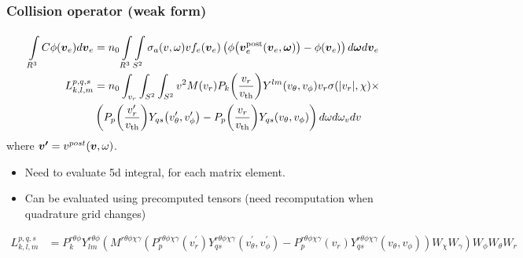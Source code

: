 \documentclass[mathserif, aspectratio=169]{beamer}
\newcommand{\vect}[1]{\boldsymbol{#1}}
\newcommand{\of}[1]{\mleft( #1 \mright)}
\newcommand{\vth}{v_{\textrm{th}}}
\newcommand{\myint}[2]{\int\limits_{#1}^{#2}}
\begin{document}
	\begin{frame}
		\frametitle{Collision operator (weak form)}
		\small{
		\begin{align*}
			\myint{R^3}{} C \phi\of{\vect{v}_e} d{\vect{v}_e} 
		 	&=
			n_0 \myint{R^3}{} \myint{S^2}{}
			\sigma_a(v,\omega) v 
			f_e\of{\vect{v}_e} \left(
			\phi\of{\vect{v}_e^\text{post}\of{\vect{v}_e,\vect{\omega}}} 
			- \phi\of{\vect{v}_e} 
			\right) d{\vect{\omega}}
			d{\vect{v}_e}  \\
			{L}_{k,l,m}^{p,q,s} &= n_0 \int_{v_r} \int_{S^2} \int_{S^2}  
			v^2 M(v_r) P_k \of{\frac{v_r}{\vth}} Y^{lm}\of{v_\theta, v_\phi} v_r\sigma(|v_r|,\chi) \times \\ & \left(
				P_p\of{\frac{v^{\prime}_r}{\vth}} Y_{qs}\of{v^{\prime}_\theta, v^{\prime}_\phi} - 
				P_p\of{\frac{v_r}{\vth}} Y_{qs}\of{v_\theta, v_\phi}
			\right) d\omega d\omega_v dv \\
		\end{align*} where $\vect{v^{\prime}} = v^{post}\of{\vect{v},\omega}$.
		}
		\begin{itemize}
			\item Need to evaluate 5d integral, for each matrix element. 
			\item Can be evaluated using precomputed tensors (need recomputation when quadrature grid changes)
		\end{itemize}
		\tiny
		{
			\begin{align*}
				{L}_{k,l,m}^{p,q,s} &=P^{r\theta\phi}_{k} Y_{lm}^{r\theta\phi} \left( M^{r\theta\phi\chi\gamma} \left(P^{r\theta\phi\chi\gamma}_{p} (v^\prime_r)	Y^{r\theta\phi\chi\gamma}_{qs} (v^\prime_\theta,v^{\prime}_\phi) - P^{r\theta\phi\chi\gamma}_{p} (v_r)	Y^{r\theta\phi\chi\gamma}_{qs} (v_\theta,v_\phi) \right) W_\chi W_\gamma \right) W_\phi W_\theta W_r
			\end{align*}
		}%
	\end{frame}


	
	
\end{document}
